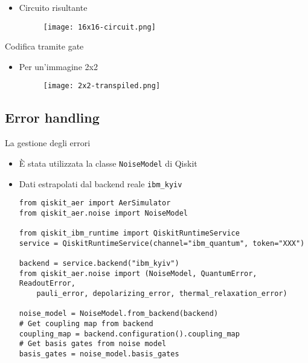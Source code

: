 \begin{frame}
	\begin{itemize}
		\item Circuito risultante
			\begin{figure}
				\centering
				\texttt{[image: 16x16-circuit.png]}
			\end{figure}
	\end{itemize}
\end{frame}

\begin{frame}{Codifica tramite gate}
	\begin{itemize}
		\item Per un'immagine 2x2
			\begin{figure}
				\centering
				\texttt{[image: 2x2-transpiled.png]}
			\end{figure}
	\end{itemize}
\end{frame}


\subsection{Error handling}

\begin{frame}[fragile]{La gestione degli errori}
	\begin{itemize}
		\item È stata utilizzata la classe \texttt{NoiseModel} di Qiskit
		\item Dati estrapolati dal backend reale \texttt{ibm\_kyiv}
		\begin{lstlisting}
from qiskit_aer import AerSimulator
from qiskit_aer.noise import NoiseModel

from qiskit_ibm_runtime import QiskitRuntimeService
service = QiskitRuntimeService(channel="ibm_quantum", token="XXX")

backend = service.backend("ibm_kyiv")
from qiskit_aer.noise import (NoiseModel, QuantumError, ReadoutError,
    pauli_error, depolarizing_error, thermal_relaxation_error)

noise_model = NoiseModel.from_backend(backend)
# Get coupling map from backend
coupling_map = backend.configuration().coupling_map
# Get basis gates from noise model
basis_gates = noise_model.basis_gates
		\end{lstlisting}
	\end{itemize}
\end{frame}

